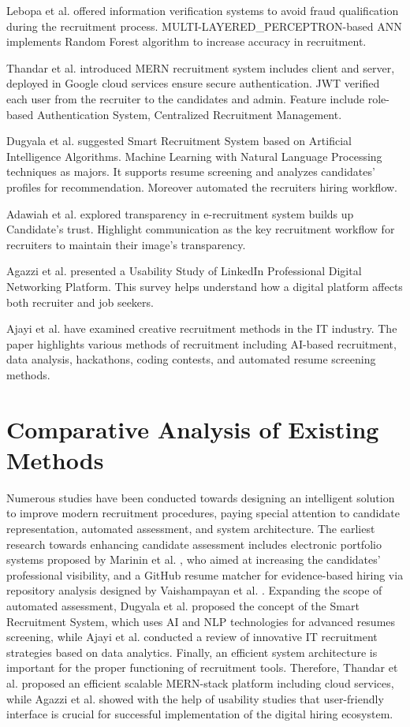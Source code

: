 Lebopa et al. \cite{Lebopa2025} offered information verification systems to avoid fraud qualification during the recruitment process. MULTI-LAYERED\_PERCEPTRON-based ANN implements Random Forest algorithm to increase accuracy in recruitment.

Thandar et al. \cite{Thandar2025} introduced MERN recruitment system includes client and server, deployed in Google cloud services ensure secure authentication. JWT verified each user from the recruiter to the candidates and admin. Feature include role-based Authentication System, Centralized Recruitment Management.

Dugyala et al. \cite{Dugyala2026} suggested Smart Recruitment System based on Artificial Intelligence Algorithms. Machine Learning with Natural Language Processing techniques as majors. It supports resume screening and analyzes candidates' profiles for recommendation. Moreover automated the recruiters hiring workflow. 

Adawiah et al. \cite{Adawiah2024} explored transparency in e-recruitment system builds up Candidate's trust. Highlight communication as the key recruitment workflow for recruiters to maintain their image's transparency.

Agazzi et al. \cite{Agazzi2020} presented a Usability Study of LinkedIn Professional Digital Networking Platform. This survey helps understand how a digital platform affects both recruiter and job seekers.

Ajayi et al. \cite{Ajayi2024} have examined creative recruitment methods in the IT industry. The paper highlights various methods of recruitment including AI-based recruitment, data analysis, hackathons, coding contests, and automated resume screening methods.

\section{Comparative Analysis of Existing Methods}
Numerous studies have been conducted towards designing an intelligent solution to improve modern recruitment procedures, paying special attention to candidate representation, automated assessment, and system architecture. The earliest research towards enhancing candidate assessment includes electronic portfolio systems proposed by Marinin et al. \cite{Marinin2025}, who aimed at increasing the candidates' professional visibility, and a GitHub resume matcher for evidence-based hiring via repository analysis designed by Vaishampayan et al. \cite{Brown2026}. Expanding the scope of automated assessment, Dugyala et al. \cite{Dugyala2026} proposed the concept of the Smart Recruitment System, which uses AI and NLP technologies for advanced resumes screening, while Ajayi et al. \cite{Ajayi2024} conducted a review of innovative IT recruitment strategies based on data analytics. Finally, an efficient system architecture is important for the proper functioning of recruitment tools. Therefore, Thandar et al. \cite{Thandar2025} proposed an efficient scalable MERN-stack platform including cloud services, while Agazzi et al. \cite{Agazzi2020} showed with the help of usability studies that user-friendly interface is crucial for successful implementation of the digital hiring ecosystem.

